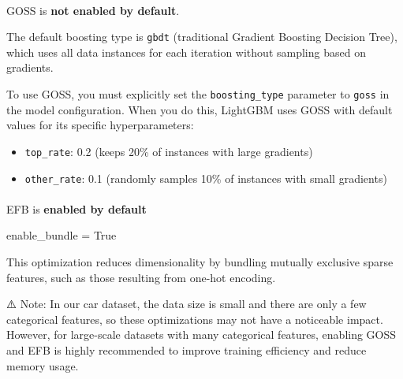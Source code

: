 \documentclass[
  letterpaper,
  DIV=11,
  numbers=noendperiod]{scrreprt}
\makeatletter
\let\oldparagraph\paragraph
\renewcommand{\paragraph}{
    \@ifstar
      \xxxParagraphStar
      \xxxParagraphNoStar
  }
\newcommand{\xxxParagraphStar}[1]{\oldparagraph*{#1}\mbox{}}
\newcommand{\xxxParagraphNoStar}[1]{\oldparagraph{#1}\mbox{}}
\newenvironment{Shaded}{\begin{snugshade}}{\end{snugshade}}
\newcommand{\NormalTok}[1]{\textcolor[rgb]{0.00,0.23,0.31}{#1}}
\newcommand{\OperatorTok}[1]{\textcolor[rgb]{0.37,0.37,0.37}{#1}}
\newcommand{\VariableTok}[1]{\textcolor[rgb]{0.07,0.07,0.07}{#1}}
\providecommand{\tightlist}{%
  \setlength{\itemsep}{0pt}\setlength{\parskip}{0pt}}\usepackage{longtable,booktabs,array}
\makeatother
\begin{document}
\paragraph{\texorpdfstring{GOSS is \textbf{not enabled by
default}.}{GOSS is not enabled by default.}}\label{goss-is-not-enabled-by-default.}

The default boosting type is \texttt{gbdt} (traditional Gradient
Boosting Decision Tree), which uses all data instances for each
iteration without sampling based on gradients.

To use GOSS, you must explicitly set the \texttt{boosting\_type}
parameter to \texttt{goss} in the model configuration. When you do this,
LightGBM uses GOSS with default values for its specific hyperparameters:

\begin{itemize}
\tightlist
\item
  \texttt{top\_rate}: 0.2 (keeps 20\% of instances with large gradients)
\item
  \texttt{other\_rate}: 0.1 (randomly samples 10\% of instances with
  small gradients)
\end{itemize}

\paragraph{\texorpdfstring{EFB is \textbf{enabled by
default}}{EFB is enabled by default}}\label{efb-is-enabled-by-default}

\begin{Shaded}
\begin{Highlighting}[]
\NormalTok{enable\_bundle }\OperatorTok{=} \VariableTok{True}
\end{Highlighting}
\end{Shaded}

This optimization reduces dimensionality by bundling mutually exclusive
sparse features, such as those resulting from one-hot encoding.

⚠️ Note: In our car dataset, the data size is small and there are only a
few categorical features, so these optimizations may not have a
noticeable impact. However, for large-scale datasets with many
categorical features, enabling GOSS and EFB is highly recommended to
improve training efficiency and reduce memory usage.
\end{document}
